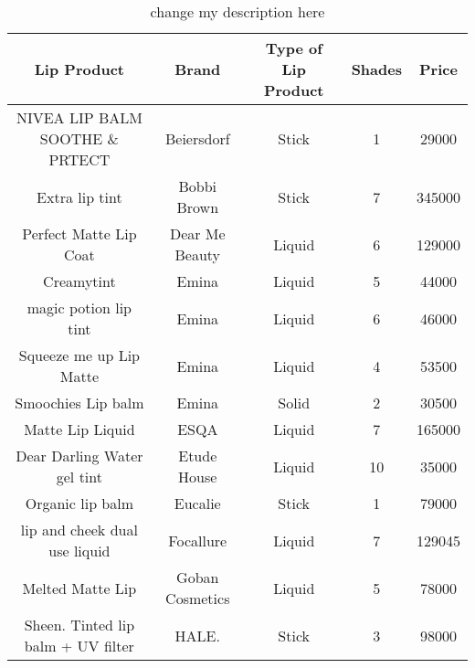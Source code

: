 
\begin{table}[htbp]
    \centering
    \caption{change my description here}
    \label{tab:change label here}
    \begin{tabular}{ccccc}        \hline
        \textbf{Lip Product}                & \textbf{Brand}    & \textbf{Type of Lip Product} & \textbf{Shades} & \textbf{Price} \\ \hline
        NIVEA LIP BALM SOOTHE \& PRTECT     & Beiersdorf        & Stick                        & 1               & 29000          \\
        Extra lip tint                      & Bobbi Brown       & Stick                        & 7               & 345000         \\
        Perfect Matte Lip Coat              & Dear Me Beauty    & Liquid                       & 6               & 129000         \\
        Creamytint                          & Emina             & Liquid                       & 5               & 44000          \\
        magic potion lip tint               & Emina             & Liquid                       & 6               & 46000          \\
        Squeeze me up Lip Matte             & Emina             & Liquid                       & 4               & 53500          \\
        Smoochies Lip balm                  & Emina             & Solid                        & 2               & 30500          \\
        Matte Lip Liquid                    & ESQA              & Liquid                       & 7               & 165000         \\
        Dear Darling Water gel tint         & Etude House       & Liquid                       & 10              & 35000          \\
        Organic lip balm                    & Eucalie           & Stick                        & 1               & 79000          \\
        lip and cheek dual use liquid       & Focallure         & Liquid                       & 7               & 129045         \\
        Melted Matte Lip                    & Goban Cosmetics   & Liquid                       & 5               & 78000          \\
        Sheen. Tinted lip balm + UV filter  & HALE.             & Stick                        & 3               & 98000          \\

\end{tabular}
\end{table}
